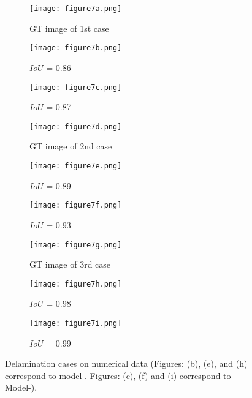 \begin{figure} [!h]
	\centering
	\begin{subfigure}[b]{0.32\textwidth}
		\centering
		\texttt{[image: figure7a.png]}
		\caption{GT image of 1st case}
		\label{fig:num_GT_391}
	\end{subfigure}
	\hfill
	\begin{subfigure}[b]{0.32\textwidth}
		\centering
		\texttt{[image: figure7b.png]} 
		\caption{\(IoU\) = 0.86}
		\label{fig:Convlstm_num_391}
	\end{subfigure}
	\hfill
	\begin{subfigure}[b]{0.32\textwidth}
		\centering
		\texttt{[image: figure7c.png]}
		\caption{\(IoU\) =  0.87}
		\label{fig:AE_num_391}
	\end{subfigure}
	\par\medskip
	\begin{subfigure}[b]{0.32\textwidth}
		\centering
		\texttt{[image: figure7d.png]}
		\caption{GT image of 2nd case}
		\label{fig:num_GT_462}
	\end{subfigure}
	\hfill
	\begin{subfigure}[b]{0.32\textwidth}
		\centering
		\texttt{[image: figure7e.png]}
		\caption{\(IoU\) = 0.89}
		\label{fig:Convlstm_num_462}
	\end{subfigure}
	\hfill
	\begin{subfigure}[b]{0.32\textwidth}
		\centering
		\texttt{[image: figure7f.png]}
		\caption{\(IoU\) = 0.93}
		\label{fig:AE_num_462}
	\end{subfigure}
	\par\medskip
	\begin{subfigure}[b]{0.32\textwidth}
		\centering
		\texttt{[image: figure7g.png]}
		\caption{GT image of 3rd case}
		\label{fig:num_GT_453}
	\end{subfigure}
	\hfill	
	\begin{subfigure}[b]{0.32\textwidth}
		\centering
		\texttt{[image: figure7h.png]}
		\caption{\(IoU\) = 0.98 }
		\label{fig:Convlstm_num_453}
	\end{subfigure}
	\hfill	
	\begin{subfigure}[b]{0.32\textwidth}
		\centering
		\texttt{[image: figure7i.png]}
		\caption{\(IoU\) = 0.99}
		\label{fig:AE_num_453}
	\end{subfigure}
	\caption{Delamination cases on numerical data (Figures: (b), (e), and (h) correspond to model-. 
		Figures: (c), (f) and (i) correspond to Model-).}
	\label{fig:num_case}
\end{figure} 
\clearpage
